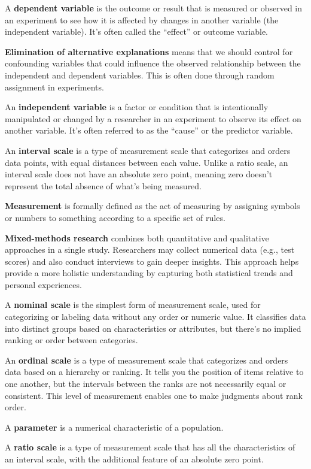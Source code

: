 \documentclass[
  letterpaper,
  DIV=11,
  numbers=noendperiod]{scrreprt}
\begin{document}
A \textbf{dependent variable} is the outcome or result that is measured
or observed in an experiment to see how it is affected by changes in
another variable (the independent variable). It's often called the
``effect'' or outcome variable.

\textbf{Elimination of alternative explanations} means that we should
control for confounding variables that could influence the observed
relationship between the independent and dependent variables. This is
often done through random assignment in experiments.

An \textbf{independent variable} is a factor or condition that is
intentionally manipulated or changed by a researcher in an experiment to
observe its effect on another variable. It's often referred to as the
``cause'' or the predictor variable.

An \textbf{interval scale} is a type of measurement scale that
categorizes and orders data points, with equal distances between each
value. Unlike a ratio scale, an interval scale does not have an absolute
zero point, meaning zero doesn't represent the total absence of what's
being measured.

\textbf{Measurement} is formally defined as the act of measuring by
assigning symbols or numbers to something according to a specific set of
rules.

\textbf{Mixed-methods research} combines both quantitative and
qualitative approaches in a single study. Researchers may collect
numerical data (e.g., test scores) and also conduct interviews to gain
deeper insights. This approach helps provide a more holistic
understanding by capturing both statistical trends and personal
experiences.

A \textbf{nominal scale} is the simplest form of measurement scale, used
for categorizing or labeling data without any order or numeric value. It
classifies data into distinct groups based on characteristics or
attributes, but there's no implied ranking or order between categories.

An \textbf{ordinal scale} is a type of measurement scale that
categorizes and orders data based on a hierarchy or ranking. It tells
you the position of items relative to one another, but the intervals
between the ranks are not necessarily equal or consistent. This level of
measurement enables one to make judgments about rank order.

A \textbf{parameter} is a numerical characteristic of a population.

A \textbf{ratio scale} is a type of measurement scale that has all the
characteristics of an interval scale, with the additional feature of an
absolute zero point.
\end{document}
